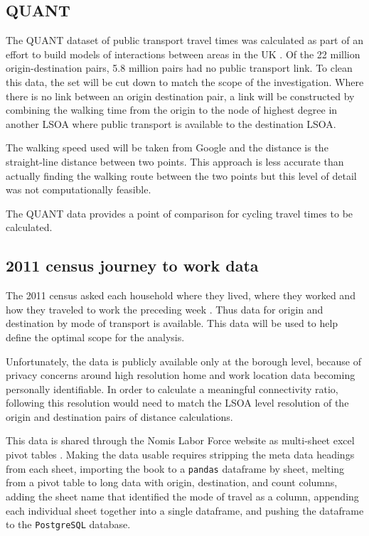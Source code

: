 \subsection{QUANT}

The QUANT dataset of public transport travel times was calculated as part of an effort to build models of interactions between areas in the UK \parencite{quant}. Of the 22 million origin-destination pairs, 5.8 million pairs had no public transport link. To clean this data, the set will be cut down to match the scope of the investigation. Where there is no link between an origin destination pair, a link will be constructed by combining the walking time from the origin to the node of highest degree in another LSOA where public transport is available to the destination LSOA. 

The walking speed used will be taken from Google and the distance is the straight-line distance between two points. This approach is less accurate than actually finding the walking route between the two points but this level of detail was not computationally feasible. 

The QUANT data provides a point of comparison for cycling travel times to be calculated. 

\subsection{2011 census journey to work data}

The 2011 census asked each household where they lived, where they worked and how they traveled to work the preceding week \parencite{jtw}. Thus data for origin and destination by mode of transport is available. This data will be used to help define the optimal scope for the analysis. 

Unfortunately, the data is publicly available only at the borough level, because of privacy concerns around high resolution home and work location data becoming personally identifiable. In order to calculate a meaningful connectivity ratio, following \cite{furth2016network} this resolution would need to match the LSOA level resolution of the origin and destination pairs of distance calculations.  


This data is shared through the Nomis Labor Force website as multi-sheet excel pivot tables \parencite{nomis}. Making the data usable requires stripping the meta data headings from each sheet, importing the book to a \texttt{pandas} dataframe by sheet, melting from a pivot table to long data with origin, destination, and count columns, adding the sheet name that identified the mode of travel as a column, appending each individual sheet together into a single dataframe, and pushing the dataframe to the \texttt{PostgreSQL} database. 


